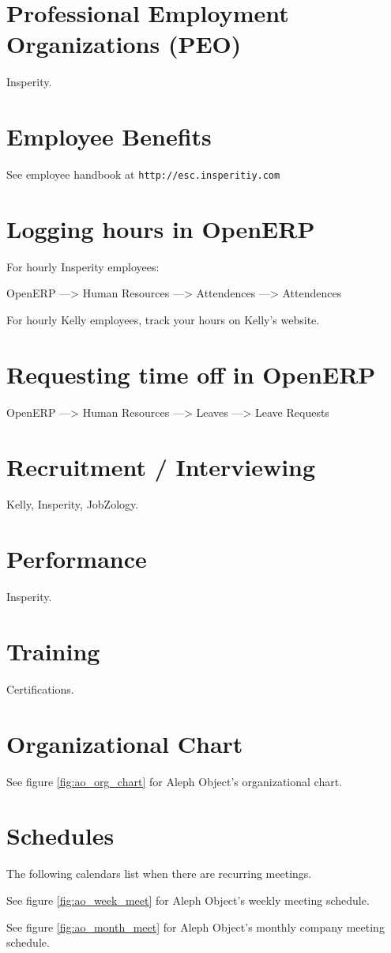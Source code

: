 %
%
%
%
%

\section{Professional Employment Organizations (PEO)}
Insperity.

\section{Employee Benefits}
See employee handbook at \texttt{http://esc.insperitiy.com}

\section{Logging hours in OpenERP}
For hourly Insperity employees:

OpenERP ---> Human Resources ---> Attendences ---> Attendences

For hourly Kelly employees, track your hours on Kelly's website.

\section{Requesting time off in OpenERP}
OpenERP ---> Human Resources ---> Leaves ---> Leave Requests

\section{Recruitment / Interviewing}
Kelly, Insperity, JobZology.

\section{Performance}
Insperity.

\section{Training}
Certifications.

\section{Organizational Chart}
See figure \ref{fig:ao_org_chart} for Aleph Object's organizational chart.


\section{Schedules}
The following calendars list when there are recurring meetings.


See figure \ref{fig:ao_week_meet} for Aleph Object's weekly meeting schedule.

See figure \ref{fig:ao_month_meet} for Aleph Object's monthly company meeting schedule.
